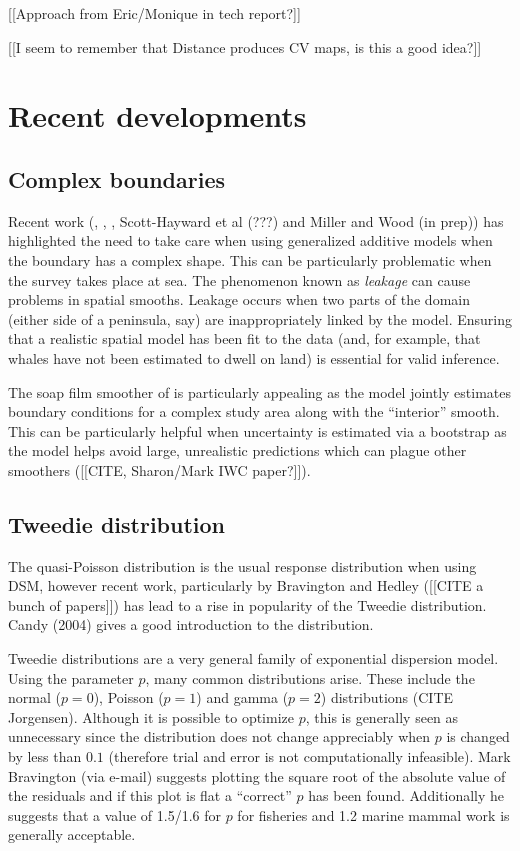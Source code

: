 \documentclass[a4paper,12pt]{article}
\begin{document}
[[Approach from Eric/Monique in tech report?]]

[[I seem to remember that Distance produces CV maps, is this a good idea?]]

\section*{Recent developments}
\label{s:recentadvances}



\subsection*{Complex boundaries}
\label{s:leakage}

Recent work (\cite{Ramsay:2002uo}, \cite{Wang:2007tf}, \cite{Wood:2008vo}, Scott-Hayward et al (???) and Miller and Wood (in prep)) has highlighted the need to take care when using generalized additive models when the boundary has a complex shape. This can be particularly problematic when the survey takes place at sea. The phenomenon known as \textit{leakage} can cause problems in spatial smooths. Leakage occurs when two parts of the domain (either side of a peninsula, say) are inappropriately linked by the model. Ensuring that a realistic spatial model has been fit to the data (and, for example, that whales have not been estimated to dwell on land) is essential for valid inference.

The soap film smoother of \cite{Wood:2008vo} is particularly appealing as the model jointly estimates boundary conditions for a complex study area along with the ``interior'' smooth. This can be particularly helpful when uncertainty is estimated via a bootstrap as the model helps avoid large, unrealistic predictions which can plague other smoothers ([[CITE, Sharon/Mark IWC paper?]]).

\subsection*{Tweedie distribution}
\label{s:Tweedie}

The quasi-Poisson distribution is the usual response distribution when using DSM, however recent work, particularly by Bravington and Hedley ([[CITE a bunch of papers]]) has lead to a rise in popularity of the Tweedie distribution. Candy (2004) gives a good introduction to the distribution. 

Tweedie distributions are a very general family of exponential dispersion model. Using the parameter $p$, many common distributions arise. These include the normal ($p=0$), Poisson ($p=1$) and gamma ($p=2$) distributions (CITE Jorgensen). Although it is possible to optimize $p$, this is generally seen as unnecessary since the distribution does not change appreciably when $p$ is changed by less than $0.1$ (therefore trial and error is not computationally infeasible). Mark Bravington (via e-mail) suggests plotting the square root of the absolute value of the residuals and if this plot is flat a ``correct'' $p$ has been found. Additionally he suggests that a value of 1.5/1.6 for $p$ for fisheries and 1.2 marine mammal work is generally acceptable.
\end{document}
